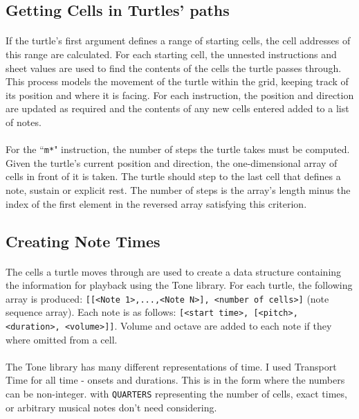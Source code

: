 \subsection{Getting Cells in Turtles' paths}

\paragraph{} If the turtle's first argument defines a range of starting cells, the cell addresses of this range are calculated. For each starting cell, the unnested instructions and sheet values are used to find the contents of the cells the turtle passes through. This process models the movement of the turtle within the grid, keeping track of its position and where it is facing. For each instruction, the position and direction are updated as required and the contents of any new cells entered added to a list of notes.

\paragraph{} For the ``\texttt{m*}" instruction, the number of steps the turtle takes must be computed. Given the turtle's current position and direction, the one-dimensional array of cells in front of it is taken. The turtle should step to the last cell that defines a note, sustain or explicit rest. The number of steps is the array's length minus the index of the first element in the reversed array satisfying this criterion.

\subsection{Creating Note Times}

\paragraph{} The cells a turtle moves through are used to create a data structure containing the information for playback using the Tone library. For each turtle, the following array is produced: \texttt{[[<Note 1>,...,<Note N>], <number of cells>]} (note sequence array). Each note is as follows: \texttt{[<start time>, [<pitch>, <duration>, <volume>]]}. Volume and octave are added to each note if they where omitted from a cell.

\paragraph{} The Tone library has many different representations of time. I used Transport Time for all time - onsets and durations. This is in the form \texttt{} where the numbers can be non-integer. with \texttt{QUARTERS} representing the number of cells, exact times, or arbitrary musical notes don't need considering.

